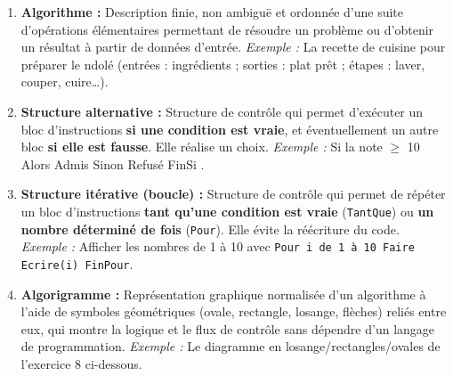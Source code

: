 \documentclass[11pt]{article}
\begin{document}
\begin{corrige}
\begin{enumerate}
\item \textbf{Algorithme :} Description finie, non ambiguë et ordonnée d'une suite d'opérations élémentaires permettant de résoudre un problème ou d'obtenir un résultat à partir de données d'entrée.
\emph{Exemple :} La recette de cuisine pour préparer le \og ndolé \fg{} (entrées : ingrédients ; sorties : plat prêt ; étapes : laver, couper, cuire\dots).

\item \textbf{Structure alternative :} Structure de contrôle qui permet d'exécuter un bloc d'instructions \textbf{si une condition est vraie}, et éventuellement un autre bloc \textbf{si elle est fausse}. Elle réalise un choix.
\emph{Exemple :} \og Si la note $\ge$ 10 Alors \og Admis \fg{} Sinon \og Refusé \fg{} FinSi \fg{}.

\item \textbf{Structure itérative (boucle) :} Structure de contrôle qui permet de répéter un bloc d'instructions \textbf{tant qu'une condition est vraie} (\texttt{TantQue}) ou \textbf{un nombre déterminé de fois} (\texttt{Pour}). Elle évite la réécriture du code.
\emph{Exemple :} Afficher les nombres de 1 à 10 avec \texttt{Pour i de 1 à 10 Faire Ecrire(i) FinPour}.

\item \textbf{Algorigramme :} Représentation graphique normalisée d'un algorithme à l'aide de symboles géométriques (ovale, rectangle, losange, flèches) reliés entre eux, qui montre la logique et le flux de contrôle sans dépendre d'un langage de programmation.
\emph{Exemple :} Le diagramme en losange/rectangles/ovales de l'exercice 8 ci-dessous.
\end{enumerate}
\end{corrige}
\end{document}
